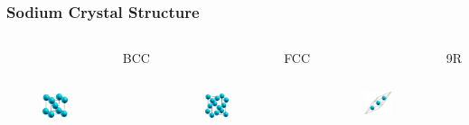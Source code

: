 \documentclass{beamer}
\begin{document}
\begin{frame}
	\frametitle{Sodium Crystal Structure}
	\begin{columns}
	\begin{figure}[ht]
	\begin{center}
		\includegraphics[height=1.3in]{nabcccrystal.png}
	\end{center}
	\end{figure}
	\begin{center}
		BCC
	\end{center}
	\begin{figure}[ht]
	\begin{center}
		\includegraphics[height=1.3in]{nafcccrystal.png}
	\end{center}
	\end{figure}
	\begin{center}
		FCC
	\end{center}
	\begin{figure}[ht]
	\begin{center}
		\includegraphics[height=1.23in]{na9rcrystal.png}
	\end{center}
	\end{figure}
	\begin{center}
		9R
	\end{center}
\end{columns}
\end{frame}
\end{document}
